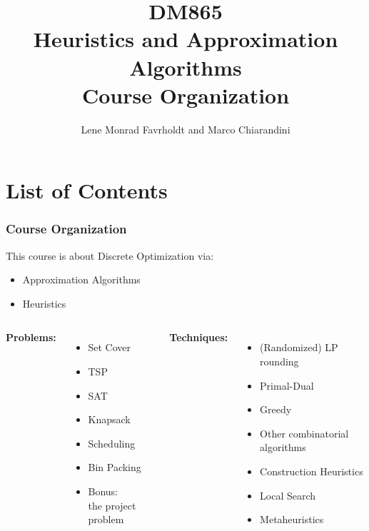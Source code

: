 \documentclass[handout,usepdftitle=false,aspectratio=169,smaller,compress,sans,fleqn,xcolor=dvipsnames,fleqn,table]{beamer}
\title{{\color{black}\normalfont\small DM865}\\
{\color{black}\normalfont\small Heuristics and Approximation Algorithms}\\[2em]
%
Course Organization}
\author{\alert{Lene Monrad Favrholdt} and Marco Chiarandini}
\date{}
\begin{document}
\frame[plain]{%
\titlepage


}
%
%
%


\section{List of Contents}

\begin{frame}%
  \frametitle{Course Organization}

This course is about Discrete Optimization via:
\medskip\begin{itemize}

\item Approximation Algorithms
\item Heuristics 
\end{itemize}


\pause
\begin{columns}[T,onlytextwidth]
\textbf{Problems:}

\begin{itemize}
  \itemsep=1ex
\item Set Cover
\item TSP
\item SAT
\item Knapsack
\item Scheduling
\item Bin Packing
\item Bonus:\\ the project problem
  \end{itemize}


\textbf{Techniques:} 

\begin{itemize}
  \itemsep=1ex
\item (Randomized) LP rounding
\item Primal-Dual
\item Greedy
\item Other combinatorial algorithms
  
\medskip
\item Construction Heuristics
\item Local Search
\item Metaheuristics
  \end{itemize}


\end{columns}
\end{frame}
\end{document}

